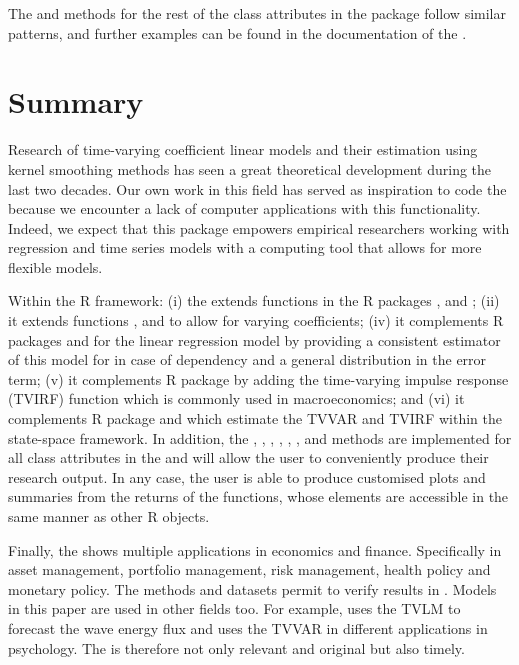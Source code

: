 The  and  methods for the rest of the class attributes in the package follow similar patterns, and further examples can be found in the documentation of the .


\section{Summary}
\label{sec:recap}

Research of time-varying coefficient linear models and their estimation using kernel smoothing methods has seen a great theoretical development during the last two decades. Our own work in this field has served as inspiration to code the  because we encounter a lack of computer applications with this functionality. Indeed, we expect that this package empowers empirical researchers working with regression and time series models with a computing tool that allows for more flexible models.

Within the R framework: (i) the  extends functions in the R packages ,  and ; (ii) it extends functions ,  and  to allow for varying coefficients; (iv) it complements R packages  and  for the linear regression model by providing a consistent estimator of this model for in case of dependency and a general distribution in the error term; (v) it complements R package  by adding the time-varying impulse response (TVIRF) function which is commonly used in macroeconomics; and (vi) it complements R package  and  which estimate the TVVAR and TVIRF within the state-space framework. In addition, the , , , , , ,  and  methods are implemented for all class attributes in the  and will allow the user to conveniently produce their research output. In any case, the user is able to produce customised plots and summaries from the returns of the functions, whose elements are accessible in the same manner as other R  objects.

Finally, the  shows multiple applications in economics and finance. Specifically in asset management, portfolio management, risk management, health policy and monetary policy. The methods and datasets permit to verify results in \cite{AslanidisCasas2013, Casasetal2018, Casasetal2019a, Casasetal2019b}. Models in this paper are used in other fields too. For example, \cite{Reikard2009} uses the TVLM to forecast the wave energy flux and \cite{Haslbecketal2021} uses the TVVAR in different applications in psychology. The  is therefore not only relevant and original but also timely.

